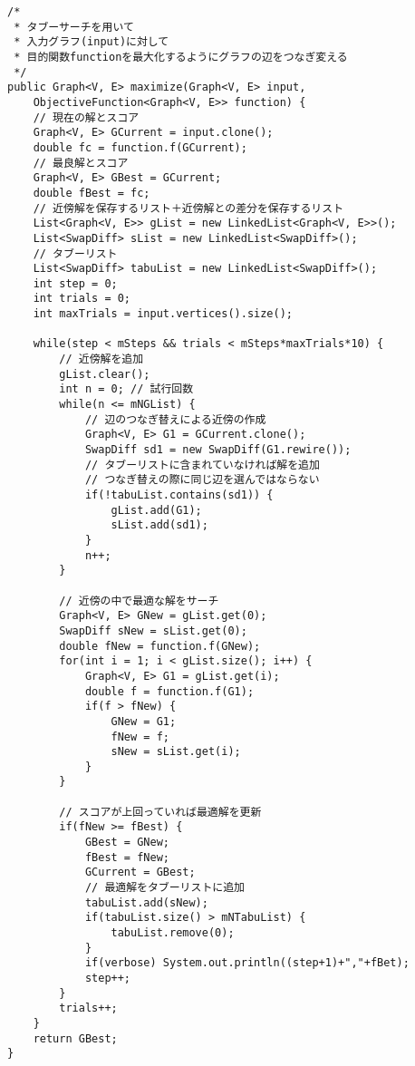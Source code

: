 \documentclass{jreport}
\begin{document}
\begin{verbatim}
/*
 * タブーサーチを用いて
 * 入力グラフ(input)に対して
 * 目的関数functionを最大化するようにグラフの辺をつなぎ変える
 */
public Graph<V, E> maximize(Graph<V, E> input,
    ObjectiveFunction<Graph<V, E>> function) {
    // 現在の解とスコア
    Graph<V, E> GCurrent = input.clone();
    double fc = function.f(GCurrent);
    // 最良解とスコア
    Graph<V, E> GBest = GCurrent;
    double fBest = fc;
    // 近傍解を保存するリスト＋近傍解との差分を保存するリスト
    List<Graph<V, E>> gList = new LinkedList<Graph<V, E>>();
    List<SwapDiff> sList = new LinkedList<SwapDiff>();
    // タブーリスト
    List<SwapDiff> tabuList = new LinkedList<SwapDiff>();
    int step = 0;
    int trials = 0;
    int maxTrials = input.vertices().size();
    
    while(step < mSteps && trials < mSteps*maxTrials*10) {
        // 近傍解を追加
        gList.clear();
        int n = 0; // 試行回数
        while(n <= mNGList) {
            // 辺のつなぎ替えによる近傍の作成
            Graph<V, E> G1 = GCurrent.clone();
            SwapDiff sd1 = new SwapDiff(G1.rewire());
            // タブーリストに含まれていなければ解を追加
            // つなぎ替えの際に同じ辺を選んではならない
            if(!tabuList.contains(sd1)) {
                gList.add(G1);
                sList.add(sd1);
            }
            n++;
        }
        
        // 近傍の中で最適な解をサーチ
        Graph<V, E> GNew = gList.get(0);
        SwapDiff sNew = sList.get(0);
        double fNew = function.f(GNew);
        for(int i = 1; i < gList.size(); i++) {
            Graph<V, E> G1 = gList.get(i);
            double f = function.f(G1);
            if(f > fNew) {
                GNew = G1;
                fNew = f;
                sNew = sList.get(i);
            }
        }
        
        // スコアが上回っていれば最適解を更新
        if(fNew >= fBest) {
            GBest = GNew;
            fBest = fNew;
            GCurrent = GBest;
            // 最適解をタブーリストに追加
            tabuList.add(sNew);
            if(tabuList.size() > mNTabuList) {
                tabuList.remove(0);
            }
            if(verbose) System.out.println((step+1)+","+fBet);
            step++;
        }
        trials++;
    }
    return GBest;
}
\end{verbatim}
\end{document}
